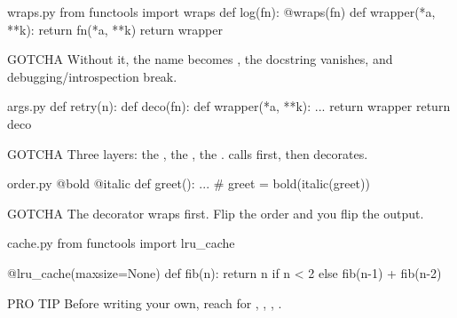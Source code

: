 \begin{sld}
  \begin{pycard}{wraps.py}
from functools import wraps
def log(fn):
    @wraps(fn)
    def wrapper(*a, **k):
        return fn(*a, **k)
    return wrapper
  \end{pycard}
  \begin{callout}[dotamber]{GOTCHA}
  Without it, the name becomes , the docstring vanishes, and debugging/introspection break.
  \end{callout}
\end{sld}

\begin{sld}
  \begin{pycard}{args.py}
def retry(n):
    def deco(fn):
        def wrapper(*a, **k):
            ...
        return wrapper
    return deco
  \end{pycard}
  \begin{callout}[dotamber]{GOTCHA}
  Three layers: the , the , the .  calls  first, then decorates.
  \end{callout}
\end{sld}

\begin{sld}
  \begin{pycard}{order.py}
@bold
@italic
def greet(): ...
# greet = bold(italic(greet))
  \end{pycard}
  \begin{callout}[dotamber]{GOTCHA}
  The decorator  wraps first. Flip the order and you flip the output.
  \end{callout}
\end{sld}

\begin{sld}
  \begin{pycard}{cache.py}
from functools import lru_cache

@lru_cache(maxsize=None)
def fib(n):
    return n if n < 2 else fib(n-1) + fib(n-2)
  \end{pycard}
  \begin{callout}[dotgreen]{PRO TIP}
  Before writing your own, reach for , , , .
  \end{callout}
\end{sld}

